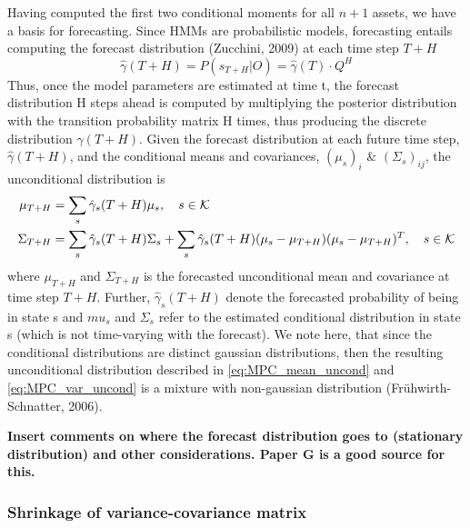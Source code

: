 Having computed the first two conditional moments for all $n+1$ assets, we have a basis for forecasting. Since HMMs are probabilistic models, forecasting entails computing the forecast distribution (Zucchini, 2009) at each time step $T+H$
\begin{equation}
    \hat\gamma(T+H) = P(s_{T+H}| O) = \hat\gamma(T) \cdot Q^H
\end{equation}
Thus, once the model parameters are estimated at time t, the forecast distribution H steps ahead is computed by multiplying the posterior distribution with the transition probability matrix H times, thus producing the discrete distribution $\hat\gamma(T+H)$. Given the forecast distribution at each future time step, $\hat\gamma(T+H)$, and the conditional means and covariances, $(\mu_{s})_i$ \& $(\Sigma_{s})_{ij}$, the unconditional distribution is
\begin{align}
    \mu_{T+H} &= \sum_s \hat\gamma_s(T+H) \mu_s,
    \quad s \in\operatorname{\mathcal{K}} \label{eq:MPC_mean_uncond} \\
    \Sigma_{T+H} &= \sum_s \hat\gamma_s(T+H) \Sigma_s + \sum_s \hat\gamma_s(T+H) (\mu_s-\mu_{T+H})(\mu_s-\mu_{T+H})^T ,
    \quad s\in\operatorname{\mathcal{K}}  \label{eq:MPC_var_uncond}
\end{align}
where $\mu_{T+H}$ and $\Sigma_{T+H}$ is the forecasted unconditional mean and covariance at time step $T+H$. Further, $\hat\gamma_s(T+H)$ denote the forecasted probability of being in state s and $mu_s$ and $\Sigma_s$ refer to the estimated conditional distribution in state s (which is not time-varying with the forecast). We note here, that since the conditional distributions are distinct gaussian distributions, then the resulting unconditional distribution described in \cref{eq:MPC_mean_uncond} and \cref{eq:MPC_var_uncond} is a mixture with non-gaussian distribution (Frühwirth-Schnatter, 2006).


\textbf{Insert comments on where the forecast distribution goes to (stationary distribution) and other considerations. Paper G is a good source for this.}

\subsubsection{Shrinkage of variance-covariance matrix}

